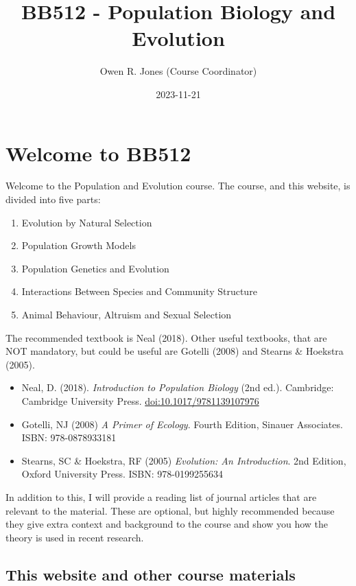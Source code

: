 \documentclass[
  a4paper]{book}
\title{BB512 - Population Biology and Evolution}
\author{Owen R. Jones (Course Coordinator)}
\date{2023-11-21}
\providecommand{\tightlist}{%
  \setlength{\itemsep}{0pt}\setlength{\parskip}{0pt}}
\begin{document}
\maketitle

{
\setcounter{tocdepth}{1}
\tableofcontents
}
\hypertarget{welcome-to-bb512}{%
\chapter{Welcome to BB512}\label{welcome-to-bb512}}

Welcome to the Population and Evolution course.
The course, and this website, is divided into five parts:

\begin{enumerate}
\def\labelenumi{\arabic{enumi}.}
\tightlist
\item
  Evolution by Natural Selection
\item
  Population Growth Models
\item
  Population Genetics and Evolution
\item
  Interactions Between Species and Community Structure
\item
  Animal Behaviour, Altruism and Sexual Selection
\end{enumerate}

The recommended textbook is Neal (2018). Other useful textbooks, that are NOT mandatory, but could be useful are Gotelli (2008) and Stearns \& Hoekstra (2005).

\begin{itemize}
\tightlist
\item
  Neal, D. (2018). \emph{Introduction to Population Biology} (2nd ed.). Cambridge: Cambridge University Press. \url{doi:10.1017/9781139107976}
\item
  Gotelli, NJ (2008) \emph{A Primer of Ecology}. Fourth Edition, Sinauer Associates. ISBN: 978-0878933181
\item
  Stearns, SC \& Hoekstra, RF (2005) \emph{Evolution: An Introduction}. 2nd Edition, Oxford University Press. ISBN: 978-0199255634
\end{itemize}

In addition to this, I will provide a reading list of journal articles that are relevant to the material. These are optional, but highly recommended because they give extra context and background to the course and show you how the theory is used in recent research.

\hypertarget{this-website-and-other-course-materials}{%
\section{This website and other course materials}\label{this-website-and-other-course-materials}}
\end{document}
